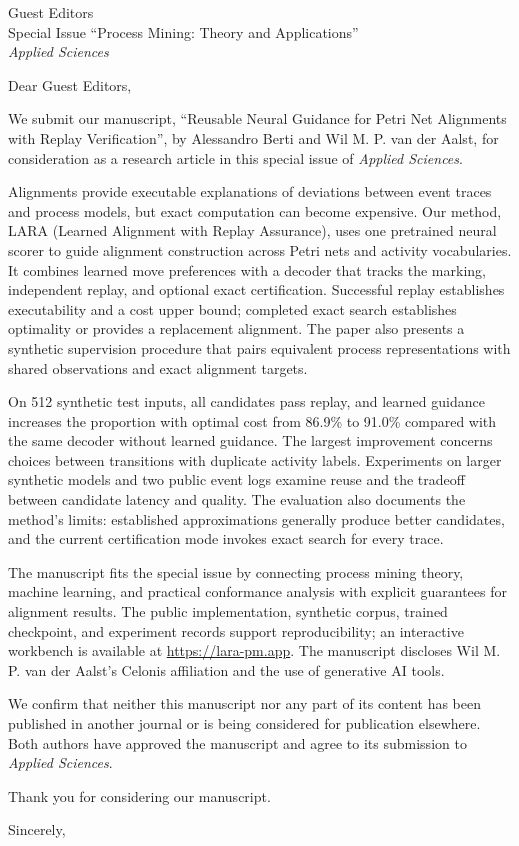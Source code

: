 \documentclass[11pt,a4paper]{letter}
\date{\today}
\begin{document}
\begin{letter}{Guest Editors\\
  Special Issue ``Process Mining: Theory and Applications''\\
  \textit{Applied Sciences}}

\opening{Dear Guest Editors,}

We submit our manuscript, ``Reusable Neural Guidance for Petri Net Alignments
with Replay Verification'', by Alessandro Berti and Wil M. P. van der Aalst,
for consideration as a research article in this special issue of
\textit{Applied Sciences}.

Alignments provide executable explanations of deviations between event traces
and process models, but exact computation can become expensive. Our method,
LARA (Learned Alignment with Replay Assurance), uses one pretrained neural
scorer to guide alignment construction across Petri nets and activity
vocabularies. It combines learned move preferences with a decoder that tracks
the marking, independent replay,
and optional exact certification. Successful replay establishes executability
and a cost upper bound; completed exact search establishes optimality or
provides a replacement alignment. The paper also presents a synthetic
supervision procedure that pairs equivalent process representations with shared
observations and exact alignment targets.

On 512 synthetic test inputs, all candidates pass replay, and learned guidance
increases the proportion with optimal cost from 86.9\% to 91.0\% compared with
the same decoder without learned guidance. The largest improvement concerns
choices between transitions with duplicate activity labels. Experiments on
larger synthetic models and two public event logs examine reuse and the tradeoff
between candidate latency and quality. The evaluation also documents the
method's limits: established approximations generally produce better candidates,
and the current certification mode invokes exact search for every trace.

The manuscript fits the special issue by connecting process mining theory,
machine learning, and practical conformance analysis with explicit guarantees
for alignment results. The public implementation, synthetic
corpus, trained checkpoint, and experiment records support reproducibility;
an interactive workbench is available at \url{https://lara-pm.app}.
The manuscript discloses Wil M. P. van der Aalst's Celonis affiliation and the
use of generative AI tools.

We confirm that neither this manuscript nor any part of its content has been
published in another journal or is being considered for publication elsewhere.
Both authors have approved the manuscript and agree to its submission to
\textit{Applied Sciences}.

Thank you for considering our manuscript.

\closing{Sincerely,}

\end{letter}
\end{document}
